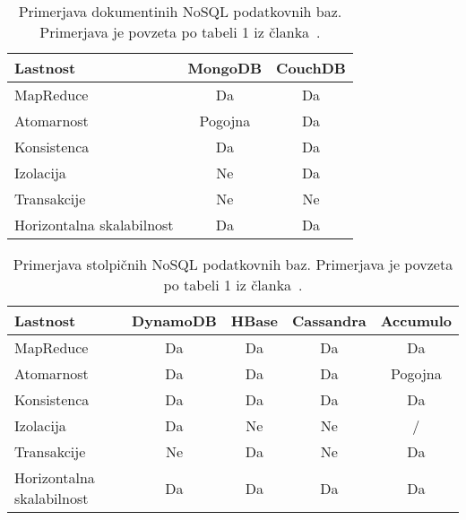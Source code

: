 \begin{table}[H]
    \centering
    \begin{tabularx}{\textwidth}{L S S}
        Lastnost                  & MongoDB & CouchDB \\ \hline
        MapReduce                 & Da      & Da      \\
        Atomarnost                & Pogojna & Da      \\
        Konsistenca               & Da      & Da      \\
        Izolacija                 & Ne      & Da      \\
        Transakcije               & Ne      & Ne      \\
        Horizontalna skalabilnost & Da      & Da      \\
    \end{tabularx}

    \caption{Primerjava dokumentinih NoSQL podatkovnih baz.
        Primerjava je povzeta po tabeli 1 iz članka~\cite{nosql}.}
    \label{tab:nosql-comparison-document}
\end{table}

\begin{table}[H]
    \centering
    \begin{tabularx}{\textwidth}{L S S S S }
        Lastnost                  & DynamoDB & HBase & Cassandra & Accumulo \\ \hline
        MapReduce                 & Da       & Da    & Da        & Da       \\
        Atomarnost                & Da       & Da    & Da        & Pogojna  \\
        Konsistenca               & Da       & Da    & Da        & Da       \\
        Izolacija                 & Da       & Ne    & Ne        & /        \\
        Transakcije               & Ne       & Da    & Ne        & Da       \\
        Horizontalna skalabilnost & Da       & Da    & Da        & Da       \\
    \end{tabularx}

    \caption{Primerjava stolpičnih NoSQL podatkovnih baz.
        Primerjava je povzeta po tabeli 1 iz članka~\cite{nosql}.}
    \label{tab:nosql-comparison-column}
\end{table}

